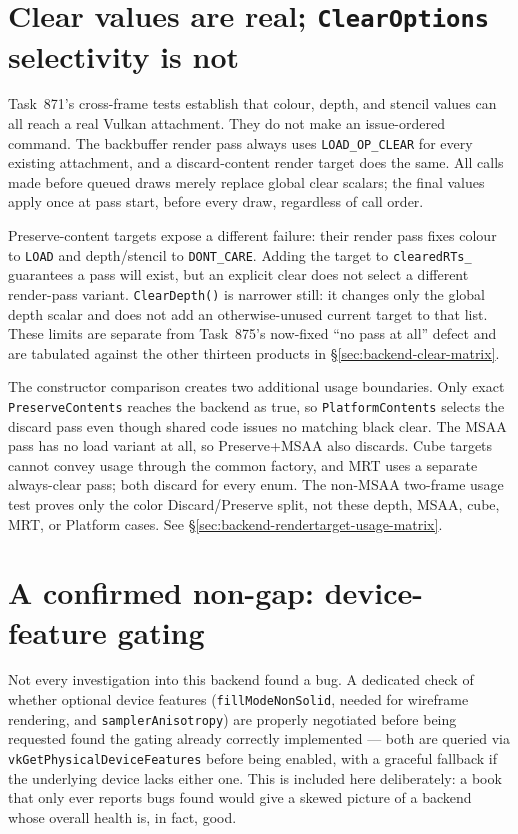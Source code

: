 \section{Clear values are real; \texttt{ClearOptions} selectivity is not}

Task~871's cross-frame tests establish that colour, depth, and stencil values can all reach a
real Vulkan attachment. They do not make  an issue-ordered command.
The backbuffer render pass always uses \texttt{LOAD\_OP\_CLEAR} for every existing attachment,
and a discard-content render target does the same. All calls made before queued draws merely
replace global clear scalars; the final values apply once at pass start, before every draw,
regardless of call order.

Preserve-content targets expose a different failure: their render pass fixes colour to
\texttt{LOAD} and depth/stencil to \texttt{DONT\_CARE}. Adding the target to
\texttt{clearedRTs\_} guarantees a pass will exist, but an explicit clear does not select a
different render-pass variant. \texttt{ClearDepth()} is narrower still: it changes only the
global depth scalar and does not add an otherwise-unused current target to that list. These
limits are separate from Task~875's now-fixed ``no pass at all'' defect and are tabulated
against the other thirteen products in \S\ref{sec:backend-clear-matrix}.

The constructor comparison creates two additional usage boundaries. Only exact
\texttt{Preserve\allowbreak{}Contents} reaches the backend as true, so
\texttt{Platform\allowbreak{}Contents} selects the discard pass even though shared code issues
no matching black clear. The MSAA pass has no load variant at all, so Preserve+MSAA also
discards. Cube targets cannot convey usage through the common factory, and MRT uses a separate
always-clear pass; both discard for every enum. The non-MSAA two-frame usage test proves only
the color Discard/Preserve split, not these depth, MSAA, cube, MRT, or Platform cases. See
\S\ref{sec:backend-rendertarget-usage-matrix}.

\section{A confirmed non-gap: device-feature gating}

Not every investigation into this backend found a bug. A dedicated check of whether optional
device features (\texttt{fillModeNonSolid}, needed for wireframe rendering, and
\texttt{samplerAnisotropy}) are properly negotiated before being requested found the gating
already correctly implemented --- both are queried via \texttt{vkGetPhysicalDeviceFeatures}
before being enabled, with a graceful fallback if the underlying device lacks either one.
This is included here deliberately: a book that only ever reports bugs found would give a
skewed picture of a backend whose overall health is, in fact, good.

